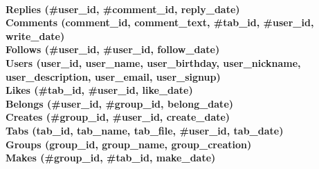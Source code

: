 \paragraph{Replies (\#user\_id, \#comment\_id, reply\_date) \\
Comments (comment\_id, comment\_text, \#tab\_id, \#user\_id, write\_date) \\
Follows (\#user\_id, \#user\_id, follow\_date) \\
Users (user\_id, user\_name, user\_birthday, user\_nickname, user\_description, user\_email, user\_signup) \\
Likes (\#tab\_id, \#user\_id, like\_date) \\
Belongs (\#user\_id, \#group\_id, belong\_date) \\
Creates (\#group\_id, \#user\_id, create\_date) \\
Tabs (tab\_id, tab\_name, tab\_file, \#user\_id, tab\_date) \\
Groups (group\_id, group\_name, group\_creation) \\
Makes (\#group\_id, \#tab\_id, make\_date) \\
}